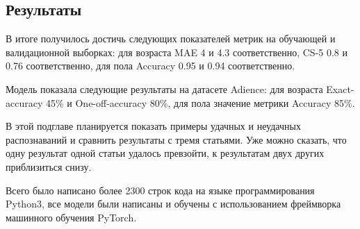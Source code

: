 \subsection{Результаты}\label{subsec:результаты}
В итоге получилось достичь следующих показателей метрик на обучающей и валидационной выборках: для возраста MAE 4 и 4.3 соответственно,
CS-5 0.8 и 0.76 соответственно, для пола Accuracy 0.95 и 0.94 соответственно.
\par Модель показала следующие результаты на датасете Adience: для возраста Exact-accuracy 45\% и One-off-accuracy 80\%,
для пола значение метрики Accuracy 85\%.
\par В этой подглаве планируется показать примеры удачных и неудачных распознаваний и сравнить результаты с тремя статьями.
Уже можно сказать, что одну результат одной статьи удалось превзойти, к результатам двух других приблизиться снизу.
\par Всего было написано более 2300 строк кода на языке программирования Python3,
все модели были написаны и обучены с использованием фреймворка машинного обучения PyTorch.